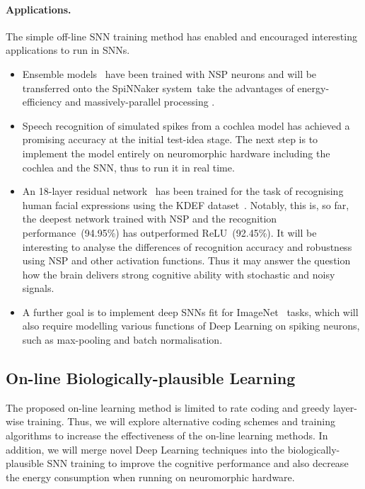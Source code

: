 \paragraph{Applications.}
The simple off-line SNN training method has enabled and encouraged interesting applications to run in SNNs.

 \begin{itemize} 
	\item Ensemble models~\citep{krogh1995neural} have been trained with NSP neurons and will be transferred onto the SpiNNaker system~\citep{furber2014spinnaker}\DIFdelbegin {}\DIFdelend \DIFaddbegin {}\DIFaddend take the advantages of energy-efficiency and massively-parallel processing \DIFaddbegin {}\DIFaddend .
	\item Speech recognition of simulated spikes from a cochlea model has achieved a promising accuracy at the initial test-idea stage.
	\DIFaddbegin {}\DIFaddend The next step is to implement the model entirely on neuromorphic hardware including the cochlea and the SNN, thus to run it in real time.
	\item An 18-layer residual network~\citep{he2016deep} has been trained for the task of recognising human facial expressions using the KDEF dataset~\citep{lundqvist1998karolinska}.
	Notably, this is, so far, the deepest network trained with NSP and the recognition performance~(94.95\%) has outperformed ReLU~(92.45\%).
	It will be interesting to analyse the differences of recognition accuracy and robustness using NSP and other activation functions.
	Thus it may answer the question how the brain delivers strong cognitive ability with stochastic and noisy signals.
 	\item A further goal is to implement deep SNNs fit for ImageNet~\citep{deng2009imagenet} tasks, which will also require modelling various functions of Deep Learning on spiking neurons, such as max-pooling and batch normalisation. 

 \end{itemize} 


\subsection{On-line Biologically-plausible Learning}
The proposed on-line learning method is limited to rate coding and greedy layer-wise training.
Thus, we will explore alternative coding schemes and training algorithms to increase the effectiveness of the on-line learning methods.
In addition, we will merge novel Deep Learning techniques into the biologically-plausible SNN training to improve the cognitive performance and also decrease the energy consumption when running on neuromorphic hardware.
